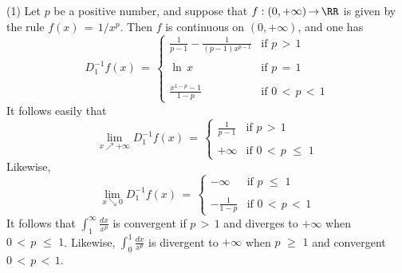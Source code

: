 {\hspace*{\parindent}(1) Let $p$ be a positive number, and suppose that $f:(0,+{\infty}) \,{\rightarrow}\, {\RR}$ is given by the rule $f(x) \,=\, 1/x^{p}$.
    Then $f$ is continuous on $(0,+{\infty})$, and one has
        \begin{displaymath}
        D^{-1}_{1} f(x) \,=\, \left\{
        \begin{array}{cl}
        {\displaystyle \frac{1}{p-1} - \frac{1}{(p-1)x^{p-1}}} & \mbox{if $p\,>\,1$}   \\
                                                               & \\
            {\ln}\,x                           & \mbox{if $p \,=\, 1$} \\
                                               &                       \\
        {\displaystyle \frac{x^{1-p}-1}{1-p}}                 & \mbox{if $0\,<\,p\,<\,1$}
        \end{array}
                                        \right.
        \end{displaymath}
    It follows easily that
        \begin{displaymath}
        \lim_{x{\nearrow}+{\infty}} D^{-1}_{1} f(x) \,=\, \left\{
        \begin{array}{cl}
        {\displaystyle \frac{1}{p-1}} & \mbox{if $p\,>\,1$} \\
                                      &                     \\
            +{\infty}                 & \mbox{if $0\,<\,p\,\,{\leq}\,\,1$}
        \end{array}
                                    \right.
        \end{displaymath}
    Likewise,
        \begin{displaymath}
        \lim_{x{\searrow}0} D^{-1}_{1} f(x) \,=\, \left\{
        \begin{array}{cl}
        -{\infty} & \mbox{if $p\,\,{\leq}\,\,1$} \\
                                      &                     \\
            -\frac{1}{1-p}                 & \mbox{if $0\,<\,p\,<\,1$}
        \end{array}
                                    \right.
        \end{displaymath}
    It follows that ${\displaystyle \int_{1}^{{\infty}} \frac{dx}{x^{p}}}$ is convergent if $p\,>\,1$ and diverges to $+{\infty}$ when $0\,<\,p\,\,{\leq}\,\,1$.
    Likewise, ${\displaystyle \int_{0}^{1} \frac{dx}{x^{p}}}$ is divergent to  $+{\infty}$ when $p\,\,{\geq}\,\,1$ and convergent $0\,<\,p\,<\,1$.

}
